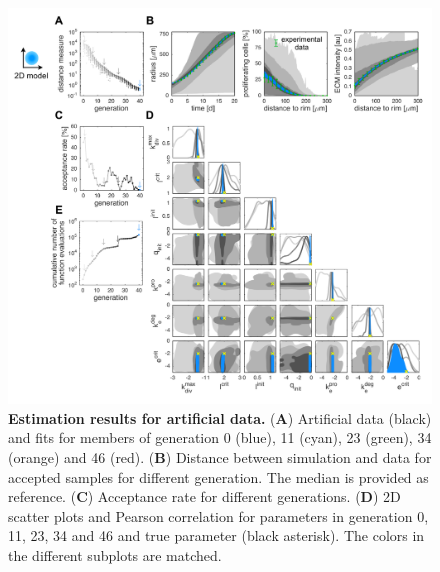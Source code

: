 \documentclass[10pt,letterpaper]{article}
\begin{document}
\begin{figure}[p]
\begin{adjustwidth}{-2in}{0in} %
\includegraphics{fig__fitting_artificial_data__2D}
\vspace*{0.5cm}
\caption{{\bf Estimation results for artificial data.}
(\textbf{A}) Artificial data (black) and fits for members of generation 0 (blue), 11 (cyan), 23 (green), 34 (orange) and 46 (red).
(\textbf{B}) Distance between simulation and data for accepted samples for different generation. The median is provided as reference. 
(\textbf{C}) Acceptance rate for different generations.
(\textbf{D}) 2D scatter plots and Pearson correlation for parameters in generation 0, 11, 23, 34 and 46 and true parameter (black asterisk). 
The colors in the different subplots are matched.
}
\label{fig: inference using 2D model}
\end{adjustwidth}
\end{figure}
\end{document}
